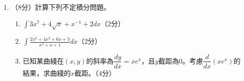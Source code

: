 \documentclass[12pt]{article}
\begin{document}
\begin{enumerate}
        \hrulefill

        \hrulefill

        \hrulefill

        \hrulefill

        \hrulefill

        \hrulefill

        \hrulefill

        \hrulefill

        \hrulefill

        \hrulefill

        \hrulefill

        \hrulefill

        \hrulefill

        \hrulefill

        \hrulefill

        \hrulefill

        \hrulefill

        \hrulefill

        \hrulefill

        \hrulefill

        \hrulefill

        \hrulefill

        \hrulefill

        \hrulefill

        \hrulefill

        \hrulefill

        \hrulefill

        \hrulefill

        \hrulefill

        \item （8分）計算下列不定積分問題。\begin{enumerate}
            \item $\displaystyle \int 3x^7+4\sqrt{x}+x^{-1}+2 dx$\hfill（2分）
            \item $\displaystyle \int \frac{2x^3+4x^2+6x+3}{x^2+x+1}dx$\hfill（2分）
            \item 已知某曲綫在$(x,y)$的斜率為$\dfrac{dy}{dx}=xe^x$，且$y$截距為0。考慮$\dfrac{d}{dx}(xe^x)$的結果，求曲綫的$x$截距。\hfill（4分）
        \end{enumerate}

        \hrulefill

        \hrulefill

        \hrulefill

        \hrulefill


\end{enumerate}
\end{document}
